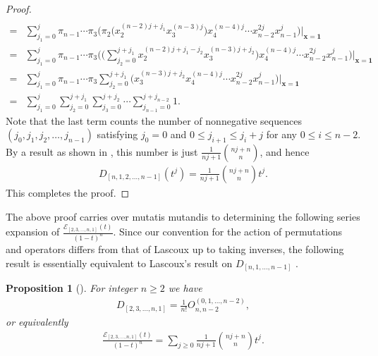 \documentclass[12pt]{article}
\newtheorem{prop}[thm]{Proposition}
\numberwithin{equation}{section}
\begin{document}
\begin{proof}
\begin{align*}
\\[5pt]
=&\sum_{j_1=0}^{j}\pi_{n-1}\cdots \pi_{3}\biggl(\pi_{2}\bigl(x_2^{(n-2)j+j_1}x_3^{(n-3)j}\bigr)x_4^{(n-4)j}\cdots x_{n-2}^{2j}x_{n-1}^{j}\biggr)\bigg|_{\mathbf{x}=\mathbf{1}}
\\[5pt]
=&\sum_{j_1=0}^{j}\pi_{n-1}\cdots \pi_{3}\biggl(\biggl(\sum_{j_2=0}^{j+j_1}x_2^{(n-2)j+j_1-j_2}x_3^{(n-3)j+j_2}\biggr)x_4^{(n-4)j}\cdots x_{n-2}^{2j}x_{n-1}^{j}\biggr)\bigg|_{\mathbf{x}=\mathbf{1}}
\\[5pt]
=&\sum_{j_1=0}^{j}\pi_{n-1}\cdots \pi_{3}\sum_{j_2=0}^{j+j_1}\biggl(x_3^{(n-3)j+j_2}x_4^{(n-4)j}\cdots x_{n-2}^{2j}x_{n-1}^{j}\biggr)\bigg|_{\mathbf{x}=\mathbf{1}}
\\[5pt]
=&\sum_{j_1=0}^{j}\sum_{j_2=0}^{j+j_1}\sum_{j_3=0}^{j+j_2}\cdots\sum_{j_{n-1}=0}^{j+j_{n-2}}1.
\end{align*}
Note that the last term counts the number of nonnegative sequences $(j_0,j_1,j_2,\ldots,j_{n-1})$ satisfying $j_0=0$ and $0\le j_{i+1}\le j_{i}+j$ for any $0\le i\le n-2$. By a result as shown in \cite[P. 5]{Heubach-Li-Mansour-2014}, this number is just $\frac{1}{nj+1}\binom{nj+n}{n}$, and hence
\begin{align*}%
D_{[n, 1,2,\ldots,n-1]}(t^j)=\frac{1}{nj+1}\binom{nj+n}{n}t^j.
\end{align*}
This completes the proof.
\end{proof}

The above proof  carries over mutatis mutandis to determining the following series expansion of $\frac{{\mathcal{E}}_{[2,3,\ldots,n,1]}(t)}{(1-t)^{n}}$.
Since our convention for the action of permutations and operators differs from that of Lascoux up to taking inverses, the following result is essentially equivalent to Lascoux's result on $D_{[n,1,\ldots,n-1]}$ \cite{Lascoux-2016}.

\begin{prop}[{\cite[P. 263]{Lascoux-2016}}]\label{thm_w'-1}
For integer $n \geq 2$ we have
\begin{align*}%
D_{[2,3,\ldots,n,1]}=\frac{1}{n!}O^{{(0,1,\ldots,n-2)}}_{n,n-2},
\end{align*}
or equivalently
\begin{align*}
\frac{{\mathcal{E}}_{[2,3,\ldots,n,1]}(t)}{(1-t)^{n}}=\sum_{j\geq 0} \frac{1}{nj+1}\binom{nj+n}{n}t^j. 
\end{align*}
\end{prop}
\end{document}
